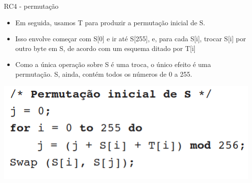 \begin{frame}{RC4 - permutação}
    \begin{itemize}


        \item    Em seguida, usamos T para produzir a permutação inicial de S.
        \item Isso envolve começar com S[0] e ir até
              S[255], e, para cada S[i], trocar S[i] por outro byte em S, de acordo com um esquema ditado por T[i]
        \item Como a única operação sobre S é uma troca, o único efeito é uma permutação. S, ainda, contém todos os
              números de 0 a 255.

    \end{itemize}

    \includegraphics[width=\linewidth]{Figuras/rc4-permutacao-inicial.png}



\end{frame}

